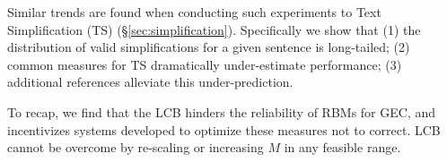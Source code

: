 \documentclass[11pt, a4paper]{article}
\newcommand{\lc}[1]{\footnote{\color{blue}LC: #1}}
\begin{document}
  Similar trends are found when conducting such experiments to Text Simplification (TS) (\S\ref{sec:simplification}).
  Specifically we show that (1) the distribution of valid simplifications for a given sentence is long-tailed; 
  (2) common measures for TS dramatically under-estimate performance; 
  (3) additional references alleviate this under-prediction.

  To recap, we find that the LCB hinders the reliability of RBMs for GEC,
  and incentivizes systems developed to optimize these measures not to correct. 
	LCB cannot be overcome by re-scaling or increasing $M$ in any feasible range. 
  

  
  
	
	

\end{document}
